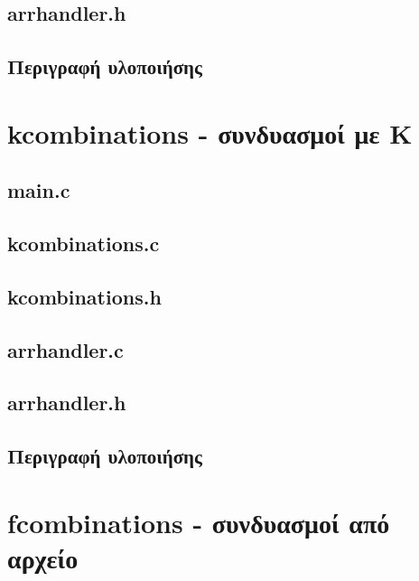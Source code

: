 \documentclass{article}
\begin{document}
    \subsection{arrhandler.h}
        

    \subsection{Περιγραφή υλοποιήσης}


\section{kcombinations - συνδυασμοί με K}

    \subsection{main.c}
        

    \subsection{kcombinations.c}
        

    \subsection{kcombinations.h}
        

    \subsection{arrhandler.c}
        

    \subsection{arrhandler.h}
         

    \subsection{Περιγραφή υλοποιήσης}


\section{fcombinations - συνδυασμοί από αρχείο}
\end{document}
